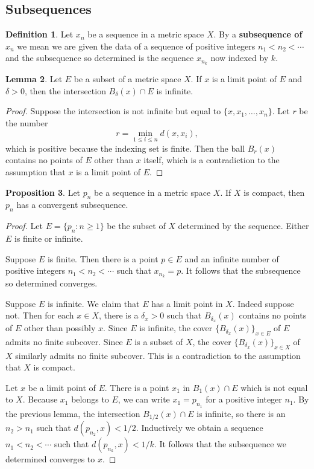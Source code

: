 \documentclass[12pt]{article}
\theoremstyle{definition}
\newtheorem{definition}{Definition}
\theoremstyle{theorem}
\newtheorem{proposition}[definition]{Proposition}
\newtheorem{lemma}[definition]{Lemma}
\begin{document}
\subsection{Subsequences}

\begin{definition}
Let $x_n$ be a sequence in a metric space $X$. By a \textbf{subsequence of $x_n$} we mean we are given the data of a sequence of positive integers $n_1 < n_2 < \cdots$ and the subsequence so determined is the sequence $x_{n_k}$ now indexed by $k$.  
\end{definition}

\begin{lemma}
Let $E$ be a subset of a metric space $X$. If $x$ is a limit point of $E$ and $\delta > 0$, then the intersection $B_\delta(x) \cap E$ is infinite. 
\end{lemma}

\begin{proof}
Suppose the intersection is not infinite but equal to $\{x, x_1, \ldots, x_n\}$. Let $r$ be the number 
\[
r = \min_{1 \leqslant i \leqslant n} d(x, x_i), 
\]
which is positive because the indexing set is finite. 
Then the ball $B_r(x)$ contains no points of $E$ other than $x$ itself, which is a contradiction to the assumption that $x$ is a limit point of $E$. 
\end{proof}

\begin{proposition}
Let $p_n$ be a sequence in a metric space $X$. If $X$ is compact, then $p_n$ has a convergent subsequence. 
\end{proposition}

\begin{proof}
Let $E = \{p_n : n \geqslant 1\}$ be the subset of $X$ determined by the sequence. Either $E$ is finite or infinite. 

Suppose $E$ is finite. Then there is a point $p \in E$ and an infinite number of positive integers $n_1 < n_2 < \cdots$ such that $x_{n_k} = p$. It follows that the subsequence so determined converges. 

Suppose $E$ is infinite. We claim that $E$ has a limit point in $X$. Indeed suppose not. Then for each $x \in X$, there is a $\delta_x > 0$ such that $B_{\delta_x}(x)$ contains no points of $E$ other than possibly $x$. Since $E$ is infinite, the cover $\{B_{\delta_x}(x)\}_{x \in E}$ of $E$ admits no finite subcover. Since $E$ is a subset of $X$, the cover $\{B_{\delta_x}(x)\}_{x \in X}$ of $X$ similarly admits no finite subcover. This is a contradiction to the assumption that $X$ is compact. 

Let $x$ be a limit point of $E$. There is a point $x_1$ in $B_1(x) \cap E$ which is not equal to $X$. Because $x_1$ belongs to $E$, we can write $x_1 = p_{n_1}$ for a positive integer $n_1$. By the previous lemma, the intersection $B_{1/2}(x) \cap E$ is infinite, so there is an $n_2 > n_1$ such that $d(p_{n_2}, x) < 1/2$. Inductively we obtain a sequence $n_1 < n_2 < \cdots$ such that $d(p_{n_k},x) < 1/k$. It follows that the subsequence we determined converges to $x$. 
\end{proof}
\end{document}
